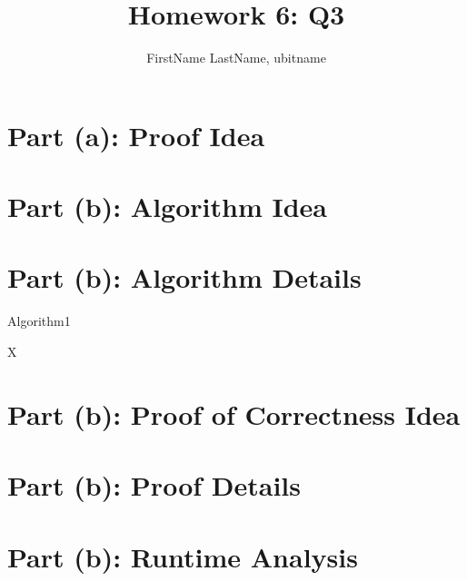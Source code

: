 \documentclass{cse331}
\title{Homework 6: Q3}
\author{FirstName LastName, ubitname}
\begin{document}
\maketitle

\section{Part (a): Proof Idea}


\section{Part (b): Algorithm Idea}


\section{Part (b): Algorithm Details}


\begin{algorithm}


    \caption{\label{algo1} Algorithm1}
    \begin{algorithmic}[1]


        \Return X

        \EndProcedure
    \end{algorithmic}
\end{algorithm}

\section{Part (b): Proof of Correctness Idea}


\section{Part (b): Proof Details}


\section{Part (b): Runtime Analysis}

\end{document}
